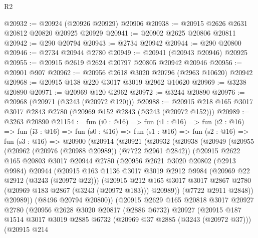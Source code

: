 \begin{lexlean}{R2}
\begin{coremodule}
@20932 := @20924 (@20926 @20929) @20906
@20938 := @20915 @2626 @2631 @20812 @20820 @20925 @20929
@20941 := @20902 @2625 @20806 @20811
@20942 := @290 @20794
@20943 := @2734 @20942
@20944 := @290 @20800
@20946 := @2734 @20944 @2780
@20949 := @20941 (@20943 @20946) @20925
@20955 := @20915 @2619 @2624 @20797 @20805 @20942 @20946
@20956 := @20901 @907
@20962 := @20956 @2618 @3020 @20796 (@2963 @10620) @20942
@20968 := @20915 @138 @220 @3017 @3019 @2962 @10620
@20969 := @3238 @20890
@20971 := @20969 @120 @2962
@20972 := @3244 @20890
@20976 := @20968 (@20971 (@3243 (@20972 @120)))
@20988 := @20915 @218 @165 @3017 @3017 @2843 @2780 (@20969 @152 @2843 (@3243 (@20972 @152)))
@20989 := @3263 @20890
@21154 := fun (i0 : @16) =>
  fun (i1 : @16) =>
  fun (i2 : @16) =>
  fun (i3 : @16) =>
  fun (s0 : @16) =>
  fun (s1 : @16) =>
  fun (s2 : @16) =>
  fun (s3 : @16) =>
  @20900
    (@20914
      (@20921
        (@20932
          (@20938
            (@20949
              (@20955
                (@20962 (@20976 (@20988 @20989)) (@7722 @2961 @2842))
                (@20915
                  @2622
                  @165
                  @20803
                  @3017
                  @20944
                  @2780
                  (@20956
                    @2621
                    @3020
                    @20802
                    (@2913 @9984)
                    @20944
                    (@20915
                      @163
                      @1136
                      @3017
                      @3019
                      @2912
                      @9984
                      (@20969 @22 @2912 (@3243 (@20972 @22)))
                      (@20915
                        @212
                        @165
                        @3017
                        @3017
                        @2867
                        @2780
                        (@20969 @183 @2867 (@3243 (@20972 @183)))
                        @20989))
                    (@7722 @2911 @2848))
                  @20989))
              (@8496 @20794 @20800))
            (@20915
              @2629
              @165
              @20818
              @3017
              @20927
              @2780
              (@20956
                @2628
                @3020
                @20817
                (@2886 @6732)
                @20927
                (@20915
                  @187
                  @1514
                  @3017
                  @3019
                  @2885
                  @6732
                  (@20969 @37 @2885 (@3243 (@20972 @37)))
                  (@20915
                    @214

\end{coremodule}
\end{lexlean}
